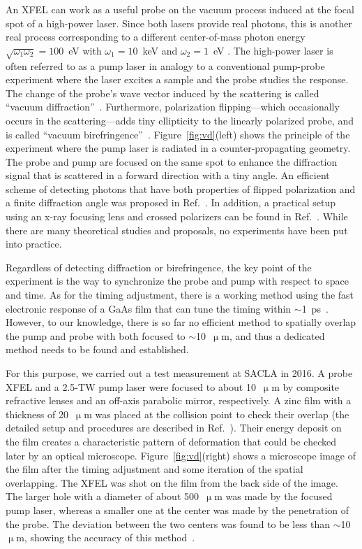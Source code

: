 \documentclass[10pt,a4paper]{article}%
\begin{document}
An XFEL can work as a useful probe on the vacuum process induced at the focal spot of a high-power laser.
Since both lasers provide real photons, this is another real process corresponding to a different center-of-mass photon energy $\sqrt{\omega_{1} \omega_{2}}=100$~eV with $\omega_{1}=10$~keV and $\omega_{2}=1$~eV .
The high-power laser is often referred to as a pump laser in analogy to a conventional pump-probe experiment where the laser excites a sample and the probe studies the response.
The change of the probe's wave vector induced by the scattering is called ``vacuum diffraction''~\cite{vd}.
Furthermore, polarization flipping---which occasionally occurs in the scattering---adds tiny ellipticity to the linearly polarized probe, and is called ``vacuum birefringence''~\cite{vb}.
Figure~\ref{fig:vd}(left) shows the principle of the experiment where the pump laser is radiated in a counter-propagating geometry.
The probe and pump are focused on the same spot to enhance the diffraction signal that is scattered in a forward direction with a tiny angle.
An efficient scheme of detecting photons that have both properties of flipped polarization and a finite diffraction angle was proposed in Ref.~\cite{karbstein}.
In addition, a practical setup using an x-ray focusing lens and crossed polarizers can be found in Ref.~\cite{schlenvoigt}.
While there are many theoretical studies and proposals, no experiments have been put into practice.

Regardless of detecting diffraction or birefringence, the key point of the experiment is the way to synchronize the probe and pump with respect to space and time.
As for the timing adjustment, there is a working method using the fast electronic response of a GaAs film that can tune the timing within $\sim$1~ps~\cite{katayama}.
However, to our knowledge, there is so far no efficient method to spatially overlap the pump and probe with both focused to $\sim$10~$\upmu$m,
and thus a dedicated method needs to be found and established.

For this purpose, we carried out a test measurement at SACLA in 2016.
A probe XFEL and a 2.5-TW pump laser were focused to about 10~$\upmu$m by composite refractive lenses and an off-axis parabolic mirror, respectively.
A zinc film with a thickness of 20~$\upmu$m was placed at the collision point to check their overlap (the detailed setup and procedures are described in Ref.~\cite{seino}).
Their energy deposit on the film creates a characteristic pattern of deformation that could be checked later by an optical microscope.
Figure~\ref{fig:vd}(right) shows a microscope image of the film after the timing adjustment and some iteration of the spatial overlapping.
The XFEL was shot on the film from the back side of the image.
The larger hole with a diameter of about 500~$\upmu$m was made by the focused pump laser, whereas a smaller one at the center was made by the penetration of the probe.
The deviation between the two centers was found to be less than $\sim$10~$\upmu$m, showing the accuracy of this method~\cite{seino}.
\end{document}

